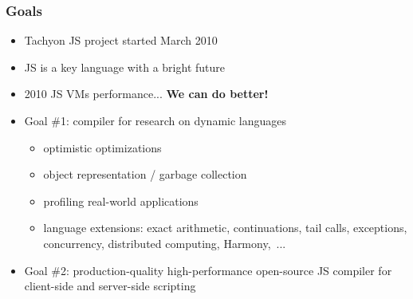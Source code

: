 \begin{frame}
\frametitle{\bf Goals}

  \begin{itemize}

  \item Tachyon JS project started March 2010
    \smallskip

  \item JS is a key language with a bright future
    \smallskip

  \item 2010 JS VMs performance... {\bf We can do better!}
    \smallskip

    \bigskip

  \item Goal \#1: compiler for research on dynamic languages
    \begin{itemize}
    \item optimistic optimizations
    \item object representation / garbage collection
    \item profiling real-world applications
    \item language extensions: exact arithmetic, continuations, tail calls, exceptions, concurrency, distributed computing, Harmony,~...
    \end{itemize}
    \smallskip

  \item Goal \#2: production-quality high-performance open-source
    JS compiler for client-side and server-side scripting

  \end{itemize}

\end{frame}

